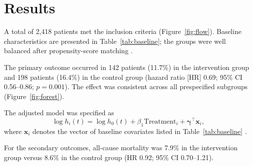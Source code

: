 \section{Results}
\label{sec:results}

A total of 2,418 patients met the inclusion criteria (Figure~\ref{fig:flow}). Baseline characteristics are presented in Table~\ref{tab:baseline}; the groups were well balanced after propensity-score matching \cite{austin2011introduction}.

The primary outcome occurred in 142 patients (11.7\%) in the intervention group and 198 patients (16.4\%) in the control group (hazard ratio [HR] 0.69; 95\% CI 0.56--0.86; $p = 0.001$). The effect was consistent across all prespecified subgroups (Figure~\ref{fig:forest}).

The adjusted model was specified as
\begin{equation}
  \log h_i(t) = \log h_0(t) + \beta_1 \text{Treatment}_i + \boldsymbol{\gamma}^\top \mathbf{x}_i ,
  \label{eq:cox}
\end{equation}
where $\mathbf{x}_i$ denotes the vector of baseline covariates listed in Table~\ref{tab:baseline} \cite{cox1972regression, therneau2000modeling}.

For the secondary outcomes, all-cause mortality was 7.9\% in the intervention group versus 8.6\% in the control group (HR 0.92; 95\% CI 0.70--1.21).
